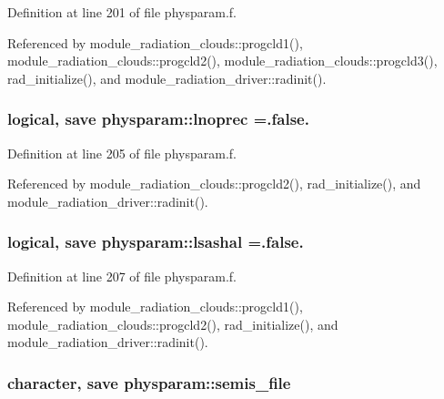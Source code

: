Definition at line 201 of file physparam.\+f.



Referenced by module\+\_\+radiation\+\_\+clouds\+::progcld1(), module\+\_\+radiation\+\_\+clouds\+::progcld2(), module\+\_\+radiation\+\_\+clouds\+::progcld3(), rad\+\_\+initialize(), and module\+\_\+radiation\+\_\+driver\+::radinit().

\subsubsection[{\texorpdfstring{lnoprec}{lnoprec}}]{\setlength{\rightskip}{0pt plus 5cm}logical, save physparam\+::lnoprec =.false.}\hypertarget{namespacephysparam_acb52e2553c9e106bd8885fd09c6e2dd2}{}\label{namespacephysparam_acb52e2553c9e106bd8885fd09c6e2dd2}


Definition at line 205 of file physparam.\+f.



Referenced by module\+\_\+radiation\+\_\+clouds\+::progcld2(), rad\+\_\+initialize(), and module\+\_\+radiation\+\_\+driver\+::radinit().

\subsubsection[{\texorpdfstring{lsashal}{lsashal}}]{\setlength{\rightskip}{0pt plus 5cm}logical, save physparam\+::lsashal =.false.}\hypertarget{namespacephysparam_abd79346fa2177075241fe6c5bc77004d}{}\label{namespacephysparam_abd79346fa2177075241fe6c5bc77004d}


Definition at line 207 of file physparam.\+f.



Referenced by module\+\_\+radiation\+\_\+clouds\+::progcld1(), module\+\_\+radiation\+\_\+clouds\+::progcld2(), rad\+\_\+initialize(), and module\+\_\+radiation\+\_\+driver\+::radinit().

\subsubsection[{\texorpdfstring{semis\+\_\+file}{semis_file}}]{\setlength{\rightskip}{0pt plus 5cm}character, save physparam\+::semis\+\_\+file}\hypertarget{namespacephysparam_a3f616dfa9c7792a45732a16e8e0433c2}{}\label{namespacephysparam_a3f616dfa9c7792a45732a16e8e0433c2}


